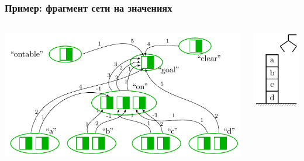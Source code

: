 \documentclass[default]{beamer}
\begin{document}
	\begin{frame}
		\frametitle{Пример: фрагмент сети на значениях}
		\begin{columns}
			\begin{column}{0.7\textwidth}
				\centering
				\includegraphics[page=2,width=\textwidth]{plan/plan_nets}
			\end{column}
			\begin{column}{0.3\textwidth}
				\centering
				\includegraphics[page=1,width=\textwidth]{plan/block_world}
			\end{column}
		\end{columns}
	\end{frame}	
\end{document}
